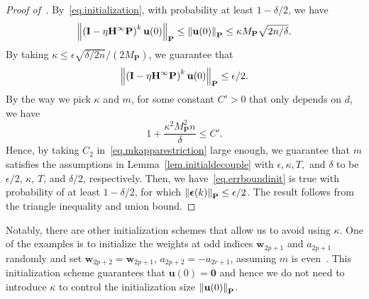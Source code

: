 \begin{proof}[Proof of~]
By~\cref{eq.initialization}, with probability at least $1 - \delta/2$,
we have
\begin{equation*}
    \left\lVert\left(\mathbf{I} - \eta \mathbf{H}^\infty\mathbf{P}\right)^k \mathbf{u}(0)\right\rVert_{\mathbf{P}} \leq \left\lVert\mathbf{u}(0)\right\rVert_{\mathbf{P}} \leq \kappa M_{\mathbf{P}}\sqrt{2n/\delta}.
\end{equation*}
By taking $\kappa \leq \epsilon \sqrt{\delta / 2n}/ (2M_{\mathbf{P}})$,
we guarantee that
\begin{equation*}
    \left\lVert\left(\mathbf{I} - \eta \mathbf{H}^\infty\mathbf{P}\right)^k \mathbf{u}(0)\right\rVert_{\mathbf{P}} \leq \epsilon / 2.
\end{equation*}
By the way we pick $\kappa$ and $m$, for some constant $C' > 0$ that only depends on $d$, we have
\begin{equation*}
    1 + \frac{\kappa^2 M_{\mathbf{P}}^2 n}{\delta} \leq C'.
\end{equation*}
Hence, by taking $C_2$ in~\cref{eq.mkapparestriction} large enough, we guarantee that $m$ satisfies the assumptions in
Lemma~\ref{lem.initialdecouple} with $\epsilon, \kappa, T,$ and $\delta$ to be $\epsilon / 2$, $\kappa$, $T$, and $\delta / 2$, respectively. Then, we have~\cref{eq.errboundinit} is true with probability of at least $1-\delta/2$, for which $\left\lVert\boldsymbol{\epsilon}(k)\right\rVert_{\mathbf{P}} \leq \epsilon / 2$. The result follows from the triangle inequality and union bound.
\end{proof}

Notably, there are other initialization schemes that allow us to avoid using $\kappa$. One of the examples is to initialize the weights at odd indices $\mathbf{w}_{2p+1}$ and $a_{2p+1}$ randomly and set $\mathbf{w}_{2p+2} = \mathbf{w}_{2p+1}$, $a_{2p+2} = -a_{2r+1}$, assuming $m$ is even~\citep{suyang}. This initialization scheme guarantees that $\mathbf{u}(0) = \mathbf{0}$ and hence we do not need to introduce $\kappa$ to control the initialization size $\left\lVert\mathbf{u}(0)\right\rVert_{\mathbf{P}}$. 

